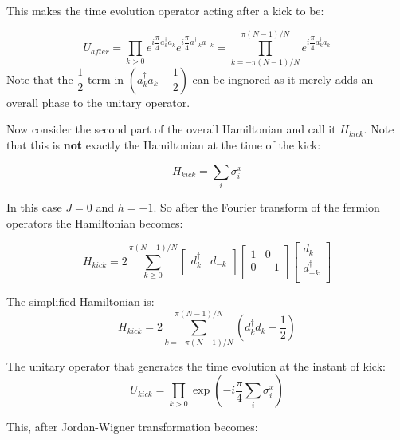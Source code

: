 \documentclass[11pt,a4paper]{article}
\begin{document}
	This makes the time evolution operator acting after a kick to be:
	
	\begin{equation}
	 U_{after} = \prod_{k>0} e^{i\dfrac{\pi}{4} a_{k}^\dagger a_{k}}e^{i\dfrac{\pi}{4} a_{-k}^\dagger a_{-k}} = \prod_{k=- \pi (N-1)/N}^{ \pi (N-1)/N} e^{i\dfrac{\pi}{4} a_{k}^\dagger a_{k}}
	 \end{equation} 
Note that the $\dfrac{1}{2}$ term in $(a_{k}^\dagger a_{k}- \dfrac{1}{2})$ can be ingnored as it merely adds  an overall phase to the unitary operator.

Now consider the second part of the overall Hamiltonian and call it $H_{kick}$. Note that this is \textbf{not} exactly the Hamiltonian at the time of the kick:

\begin{equation}
H_{kick} = \sum_{i}\sigma_{i}^x
\end{equation}

In this case $J = 0$ and $h = -1$. So after the Fourier transform of the fermion operators the Hamiltonian becomes:

\begin{equation}
H_{kick} = 2\sum_{k\geq0}^{ \pi (N-1)/N}\begin{bmatrix}
	    d_{k}^{\dagger} & d_{-k}\\
	    \end{bmatrix} \begin{bmatrix}
	    1 & 0\\
	    0 & -1 \\
	    \end{bmatrix}\begin{bmatrix}
	    d_{k}\\d_{-k}^{\dagger}\\
	    \end{bmatrix}
\end{equation}

The simplified Hamiltonian is:
	\begin{equation}
		H_{kick} = 2\sum_{k=- \pi (N-1)/N}^{ \pi (N-1)/N} (d_{k}^{\dagger}d_{k}-\dfrac{1}{2})  
		\end{equation}
	

The unitary operator that generates the time evolution at the instant of kick:
	\begin{equation}
	U_{kick} = \prod_{k>0} \exp(-i\dfrac{\pi}{4}\sum_{i}\sigma_{i}^x)
		\end{equation}
		
		This, after Jordan-Wigner transformation becomes:
		
\end{document}
